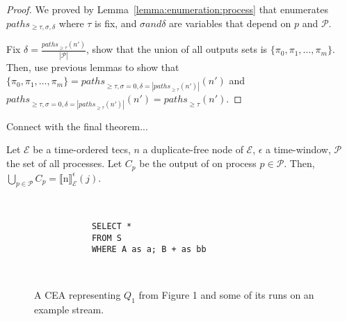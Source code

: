 \begin{proof}
  We proved by Lemma~\ref{lemma:enumeration:process} that  enumerates $paths_{\ge \tau, \sigma, \delta}$ where $\tau$ is fix, and $\sigma and \delta$ are variables that depend on $p$ and $\mathcal{P}$.

  Fix $\delta = \frac{{paths}_{\ge \tau}(n')}{|\mathcal{P}|}$, show that the union of all outputs sets is $\{\pi_{0}, \pi_{1}, \ldots, \pi_{m}\}$. Then, use previous lemmas to show that $\{\pi_{0}, \pi_{1}, \ldots, \pi_{m}\} = {paths}_{\ge \tau, \sigma=0, \delta=|{paths}_{\ge \tau}(n')|}(n')$ and ${paths}_{\ge \tau, \sigma=0, \delta=|{paths}_{\ge \tau}(n')|}(n') = {paths}_{\ge \tau}(n')$.
\end{proof}


Connect with the final theorem...

\begin{theorem}\label{theorem:enumeration}
  Let $\mathcal{E}$ be a time-ordered \acrshort{tecs}, $n$ a duplicate-free node of $\mathcal{E}$, $\epsilon$ a time-window, $\mathcal{P}$ the set of all processes. Let $C_{p}$ be the output of  on process $p \in \mathcal{P}$. Then, $\bigcup\limits_{p \in \mathcal{P}} C_{p} = {\llbracket \text{n} \rrbracket}^{\epsilon}_{\mathcal{E}}(j)$.
\end{theorem}


\newpage

\begin{figure}[H]
  \centering
  \begin{subfigure}[t]{\textwidth}
    \centering
  \end{subfigure}
  \\
  \begin{subfigure}[b]{\textwidth}
    \begin{verbatim}
      SELECT *
      FROM S
      WHERE A as a; B + as bb
    \end{verbatim}
  \end{subfigure}
  \\
  \begin{subfigure}[b]{\textwidth}
    \centering
  \end{subfigure}
  \caption{A CEA representing $Q_{1}$ from Figure 1 and some of its runs on an example stream.}
  \label{fig:label}
\end{figure}

